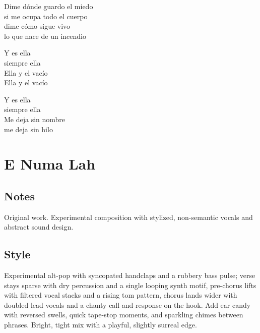 \begin{lyrics}
Dime dónde guardo el miedo\\
si me ocupa todo el cuerpo\\
dime cómo sigue vivo\\
lo que nace de un incendio

Y es ella\\
siempre ella\\
Ella y el vacío\\
Ella y el vacío

Y es ella\\
siempre ella\\
Me deja sin nombre\\
me deja sin hilo
\end{lyrics}

\section{E Numa Lah}

\subsection{Notes}
Original work.
Experimental composition with stylized, non-semantic vocals and abstract sound design.

\subsection{Style}
Experimental alt-pop with syncopated handclaps and a rubbery bass pulse; verse stays sparse with dry percussion and a single looping synth motif, pre-chorus lifts with filtered vocal stacks and a rising tom pattern, chorus lands wider with doubled lead vocals and a chanty call-and-response on the hook. Add ear candy with reversed swells, quick tape-stop moments, and sparkling chimes between phrases. Bright, tight mix with a playful, slightly surreal edge.

